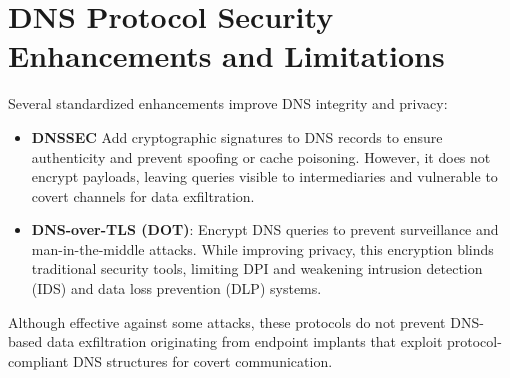 \documentclass [11pt, proquest] {uwthesis}[2020/02/24]
\begin{document}
\section{DNS Protocol Security Enhancements and Limitations}
Several standardized enhancements improve DNS integrity and privacy:
	\begin{itemize}[nosep]
	    \item \textbf{DNSSEC} Add cryptographic signatures to DNS records to ensure authenticity and prevent spoofing or cache poisoning. However, it does not encrypt payloads, leaving queries visible to intermediaries and vulnerable to covert channels for data exfiltration.
        \item \textbf{DNS-over-TLS (DOT)}: Encrypt DNS queries to prevent surveillance and man-in-the-middle attacks. While improving privacy, this encryption blinds traditional security tools, limiting DPI and weakening intrusion detection (IDS) and data loss prevention (DLP) systems.
	\end{itemize}
Although effective against some attacks, these protocols do not prevent DNS-based data exfiltration originating from endpoint implants that exploit protocol-compliant DNS structures for covert communication.


\end{document}
